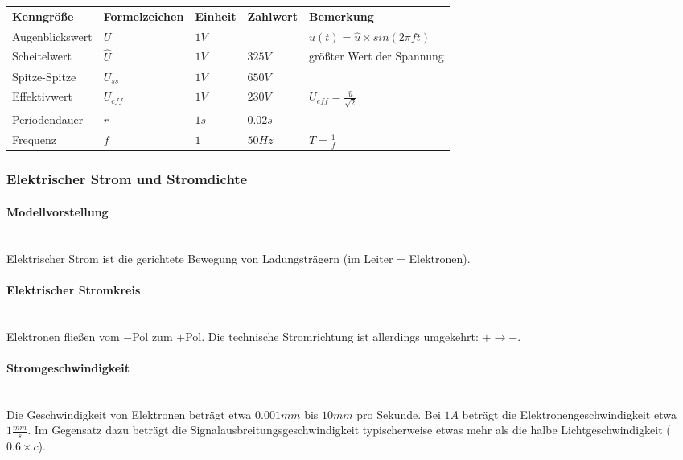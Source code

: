 \begin{tabular}{lllll}
{\bf Kenngröße}	& {\bf Formelzeichen}	& {\bf Einheit} & {\bf Zahlwert} & {\bf Bemerkung}\\ 
Augenblickswert	& $U$ 					& $1V$	& & $u(t)=\hat{u}\times sin(2\pi f t)$\\
Scheitelwert		& $\widehat{U}$			& $1V$	& $325V$		& größter Wert der Spannung\\
Spitze-Spitze	& $U_{ss}$				& $1V$	& $650V$		& \\
Effektivwert		& $U_{eff}$				& $1V$	& $230V$		& $U_{eff}=\frac{\hat{u}}{\sqrt{2}}$\\
Periodendauer	& $r$					& $1s$	& $0.02s$	& \\
Frequenz			& $f$					& $1$	& $50 Hz$	& $T = \frac{1}{f}$ \\
\end{tabular}		
		
	\subsubsection{Elektrischer Strom und Stromdichte}
		\paragraph{Modellvorstellung}~\\

\noindent Elektrischer Strom ist die gerichtete Bewegung von Ladungsträgern (im Leiter = Elektronen).

		\paragraph{Elektrischer Stromkreis}~\\
		
\noindent Elektronen fließen vom $-$Pol zum $+$Pol. Die technische Stromrichtung ist allerdings umgekehrt: $+ \to -$.		
		
		\paragraph{Stromgeschwindigkeit}~\\
		
\noindent Die Geschwindigkeit von Elektronen beträgt etwa $0.001mm$ bis $10mm$ pro Sekunde. Bei $1A$ beträgt die Elektronengeschwindigkeit etwa $1\frac{mm}{s}$. Im Gegensatz dazu beträgt die Signalausbreitungsgeschwindigkeit typischerweise etwas mehr als die halbe Lichtgeschwindigkeit ($0.6\times c$).
	
